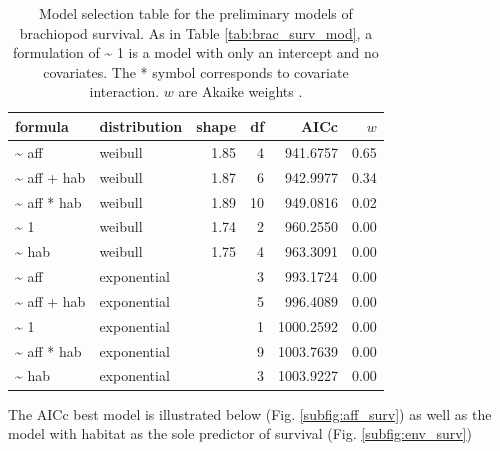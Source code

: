 \documentclass[12pt,letterpaper]{article}
\begin{document}
\begin{table}[ht]
  \centering
  \begin{tabular}{llrrrr}
    \hline
    formula & distribution & shape & df & AICc & \(w\) \\ 
    \hline
    \~{} aff & weibull & 1.85 & 4 & 941.6757 & 0.65 \\ 
    \~{} aff + hab & weibull & 1.87 & 6 & 942.9977 & 0.34 \\ 
    \~{} aff * hab & weibull & 1.89 & 10 & 949.0816 & 0.02 \\ 
    \~{} 1 & weibull & 1.74 & 2 & 960.2550 & 0.00 \\ 
    \~{} hab & weibull & 1.75 & 4 & 963.3091 & 0.00 \\ 
    \~{} aff & exponential &  & 3 & 993.1724 & 0.00 \\ 
    \~{} aff + hab & exponential &  & 5 & 996.4089 & 0.00 \\ 
    \~{} 1 & exponential &  & 1 & 1000.2592 & 0.00 \\ 
    \~{} aff * hab & exponential &  & 9 & 1003.7639 & 0.00 \\ 
    \~{} hab & exponential &  & 3 & 1003.9227 & 0.00 \\ 
    \hline
  \end{tabular}
  \caption[Brachiopod survival models]{Model selection table for the preliminary models of brachiopod survival. As in Table \ref{tab:brac_surv_mod}, a formulation of \~{} 1 is a model with only an intercept and no covariates. The * symbol corresponds to covariate interaction. \(w\) are Akaike weights \citep{Burnham2002a}.}
  \label{tab:bracmod}
\end{table}

The AICc best model is illustrated below (Fig. \ref{subfig:aff_surv}) as well as the model with habitat as the sole predictor of survival (Fig. \ref{subfig:env_surv})
\end{document}
